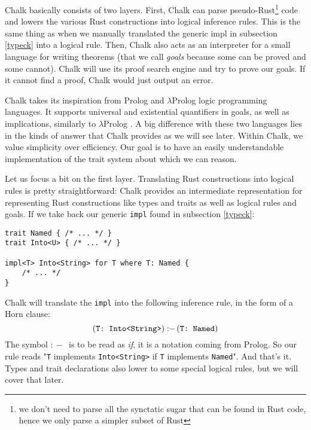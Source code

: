 \documentclass[twocolumn]{article}
\newcommand{\rust}[1]{\texttt{#1}}
\newcommand{\mrust}[1]{\text{\rust{#1}}}
\newcommand{\pif}[0]{:\!\!-\,}
\begin{document}
Chalk basically consists of two layers. First, Chalk can parse pseudo-Rust\footnote{we don't need to parse all the synctatic sugar that can be found in Rust code, hence we only parse a simpler subset of Rust} code and lowers the various Rust constructions into logical inference rules. This is the same thing as when we manually translated the generic impl in subsection \ref{typeck} into a logical rule. Then, Chalk also acts as an interpreter for a small language for writing theorems (that we call \textit{goals} because some can be proved and some cannot). Chalk will use its proof search engine and try to prove our goals. If it cannot find a proof, Chalk would just output an error.

Chalk takes its inspiration from Prolog and $\lambda$Prolog logic programming languages. It supports universal and existential quantifiers in goals, as well as implications, similarly to $\lambda$Prolog \cite{lprolog}. A big difference with these two languages lies in the kinds of answer that Chalk provides as we will see later. Within Chalk, we value simplicity over efficiency. Our goal is to have an easily understandable implementation of the trait system about which we can reason.

Let us focus a bit on the first layer. Translating Rust constructions into logical rules is pretty straightforward: Chalk provides an intermediate representation for representing Rust constructions like types and traits as well as logical rules and goals. If we take back our generic \rust{impl} found in subsection \ref{typeck}:
\begin{verbatim}
trait Named { /* ... */ }
trait Into<U> { /* ... */ }

impl<T> Into<String> for T where T: Named {
    /* ... */
}
\end{verbatim}
Chalk will translate the \rust{impl} into the following inference rule, in the form of a Horn clause:
\[
    (\mrust{T: Into<String>}) \pif (\mrust{T: Named})
\]
The symbol $\pif$ is to be read as \textit{if}, it is a notation coming from Prolog. So our rule reads "\rust{T} implements \rust{Into<String>} if \rust{T} implements \rust{Named}". And that's it. Types and trait declarations also lower to some special logical rules, but we will cover that later.
\end{document}
